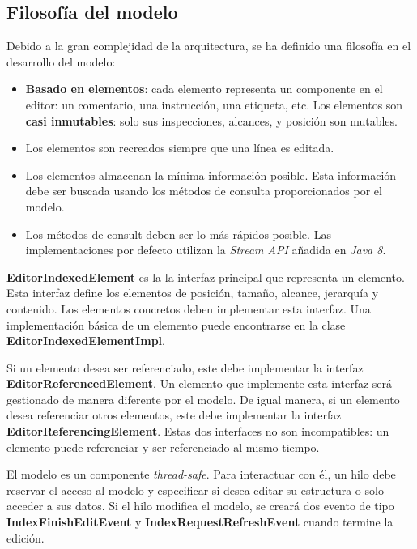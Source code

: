 \subsection{Filosofía del modelo}\label{subsec:filosofía-del-modelo}

Debido a la gran complejidad de la arquitectura,
se ha definido una filosofía en el desarrollo
del modelo:
\begin{itemize}
    \item \textbf{Basado en elementos}: cada elemento representa
    un componente en el editor: un comentario, una instrucción,
    una etiqueta, etc.
    Los elementos son \textbf{casi inmutables}:
    solo sus inspecciones, alcances, y posición son mutables.
    \item Los elementos son recreados siempre que una línea
    es editada.
    \item Los elementos almacenan la mínima información
    posible.
    Esta información debe ser buscada usando los métodos
    de consulta proporcionados por el modelo.
    \item Los métodos de consult deben ser lo más rápidos
    posible.
    Las implementaciones por defecto utilizan la
    \textit{Stream API}\cite{STREAM_API} añadida en \textit{Java 8}.
\end{itemize}

\noindent \textbf{EditorIndexedElement} es la la interfaz principal
que representa un elemento.
Esta interfaz define los elementos de posición, tamaño, alcance,
jerarquía y contenido.
Los elementos concretos deben implementar esta interfaz.
Una implementación básica de un elemento puede encontrarse
en la clase \textbf{EditorIndexedElementImpl}.

\noindent Si un elemento desea ser referenciado, este debe
implementar la interfaz \textbf{EditorReferencedElement}.
Un elemento que implemente esta interfaz será gestionado
de manera diferente por el modelo.
De igual manera, si un elemento desea referenciar
otros elementos, este debe implementar la interfaz
\textbf{EditorReferencingElement}.
Estas dos interfaces no son incompatibles:
un elemento puede referenciar y ser referenciado
al mismo tiempo.

\noindent El modelo es un componente \textit{thread-safe}.
Para interactuar con él, un hilo debe reservar el acceso
al modelo y especificar si desea editar su estructura o
solo acceder a sus datos.
Si el hilo modifica el modelo, se creará dos evento de tipo
\textbf{IndexFinishEditEvent} y \textbf{IndexRequestRefreshEvent}
cuando termine la edición.


